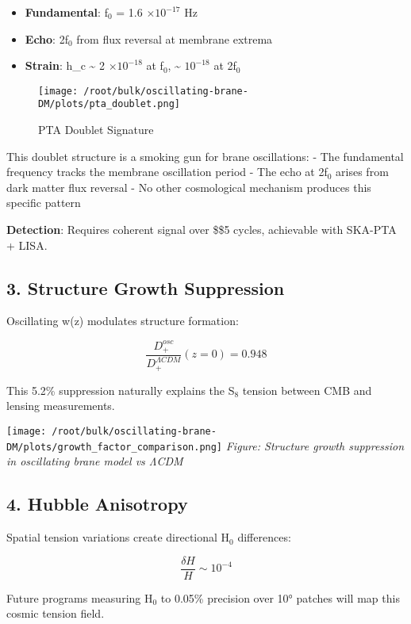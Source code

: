 \documentclass[
  11pt,
]{report}
\providecommand{\tightlist}{%
  \setlength{\itemsep}{0pt}\setlength{\parskip}{0pt}}
\begin{document}
\begin{itemize}
\tightlist
\item
  \textbf{Fundamental}: f\(_0\) = 1.6 \(\times 10^{-17}\) Hz
\item
  \textbf{Echo}: 2f\(_0\) from flux reversal at membrane extrema
\item
  \textbf{Strain}: h\_c \textasciitilde{} 2 \(\times 10^{-18}\) at
  f\(_0\), \textasciitilde{} \(10^{-18}\) at 2f\(_0\)
\end{itemize}

\begin{figure}
\centering
\texttt{[image: /root/bulk/oscillating-brane-DM/plots/pta\_doublet.png]}
\caption{PTA Doublet Signature}
\end{figure}

This doublet structure is a smoking gun for brane oscillations: - The
fundamental frequency tracks the membrane oscillation period - The echo
at 2f\(_0\) arises from dark matter flux reversal - No other
cosmological mechanism produces this specific pattern

\textbf{Detection}: Requires coherent signal over \$\geq\$5 cycles,
achievable with SKA-PTA + LISA.

\subsection{3. Structure Growth
Suppression}\label{structure-growth-suppression}

Oscillating w(z) modulates structure formation:

\[\frac{D_+^{osc}}{D_+^{ΛCDM}}(z=0) = 0.948\]

This 5.2\% suppression naturally explains the S\(_8\) tension between
CMB and lensing measurements.

\texttt{[image: /root/bulk/oscillating-brane-DM/plots/growth\_factor\_comparison.png]}
\emph{Figure: Structure growth suppression in oscillating brane model vs
ΛCDM}

\subsection{4. Hubble Anisotropy}\label{hubble-anisotropy}

Spatial tension variations create directional H\(_0\) differences:

\[\frac{\delta H}{H} \sim 10^{-4}\]

Future programs measuring H\(_0\) to 0.05\% precision over 10° patches
will map this cosmic tension field.
\end{document}
